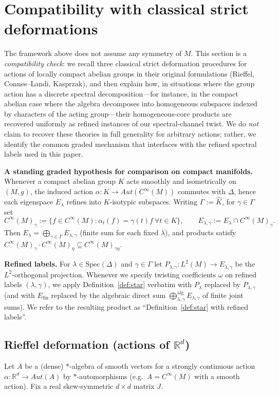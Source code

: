 \documentclass[11pt]{amsart}
\theoremstyle{plain}
\theoremstyle{definition}
\theoremstyle{remark}
\newcommand{\Spec}{\mathrm{Spec}}
\newcommand{\bbR}{\mathbb{R}}
\newcommand{\Aut}{Aut}
\begin{document}
\section{Compatibility with classical strict deformations}\label{sec:classical}

The framework above does not assume any symmetry of $M$.
This section is a \emph{compatibility check}: we recall three classical strict deformation procedures for actions of locally compact abelian groups
in their original formulations (Rieffel, Connes--Landi, Kasprzak), and then explain how, in situations where the group action has a discrete spectral decomposition---for instance, in the compact abelian case where the algebra decomposes into homogeneous subspaces indexed by characters of the acting group---their homogeneous-core products are recovered uniformly as refined instances of our spectral-channel twist. 
We do \emph{not} claim to recover these theories in full generality for arbitrary actions; rather, we identify the common graded mechanism
that interfaces with the refined spectral labels used in this paper.

\medskip
\noindent\textbf{A standing graded hypothesis for comparison on compact manifolds.}
Whenever a compact abelian group $K$ acts smoothly and isometrically on $(M,g)$, the induced action $\alpha:K\to\Aut(C^\infty(M))$
commutes with $\Delta$, hence each eigenspace $E_\lambda$ refines into $K$-isotypic subspaces.  Writing $\Gamma:=\widehat K$,
for $\gamma\in\Gamma$ set
\[
C^\infty(M)_\gamma:=\{f\in C^\infty(M):\alpha_t(f)=\gamma(t)f\ \forall t\in K\},
\qquad
E_{\lambda,\gamma}:=E_\lambda\cap C^\infty(M)_\gamma.
\]
Then $E_\lambda=\bigoplus_{\gamma\in\Gamma}E_{\lambda,\gamma}$ (finite sum for each fixed $\lambda$), and products satisfy
$C^\infty(M)_\gamma\cdot C^\infty(M)_\eta\subseteq C^\infty(M)_{\gamma\eta}$.

\medskip
\noindent\textbf{Refined labels.} For $\lambda\in\Spec(\Delta)$ and $\gamma\in\Gamma$ let $P_{\lambda,\gamma}:L^2(M)\to E_{\lambda,\gamma}$ be the $L^2$-orthogonal projection. Whenever we specify twisting coefficients $\omega$ on refined labels $(\lambda,\gamma)$, we apply Definition~\ref{def:star} verbatim with $P_\lambda$ replaced by $P_{\lambda,\gamma}$ (and with $E_{\mathrm{fin}}$ replaced by the algebraic direct sum $\bigoplus_{\lambda,\gamma}^{\mathrm{alg}}E_{\lambda,\gamma}$ of finite joint sums). We refer to the resulting product as ``Definition~\ref{def:star} with refined labels''.

\subsection{Rieffel deformation (actions of $\bbR^d$)}\label{subsec:Rieffel} 
Let $A$ be a (dense) $*$-algebra of smooth vectors for a strongly continuous action $\alpha:\bbR^d\to\Aut(A)$ by $*$-automorphisms
(e.g.\ $A=C^\infty(M)$ with a smooth action).  Fix a real skew-symmetric $d\times d$ matrix $J$.
\end{document}

